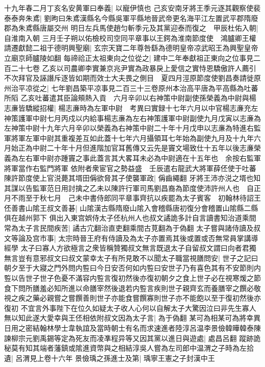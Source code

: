十九年春二月丁亥名安黄軍曰奉義|{
	以寵伊慎也}
己亥安南牙將王季元逐其觀察使裴泰泰奔朱鳶|{
	劉昫曰朱鳶漢縣名今縣吳軍平縣地晉武帝更名海平江左置武平郡隋廢郡為朱鳶縣唐屬交州}
明日左兵馬使趙匀斬季元及其黨迎泰而復之　甲辰杜佑入朝|{
	自淮南入朝}
三月壬子朔以佑檢校司空同平章事以王鍔為淮南節度使　鴻臚卿王權請遷獻懿二祖于德明興聖廟|{
	玄宗天寶二年尊咎繇為德明皇帝凉武昭王為興聖皇帝立廟京師臚陵如翻}
每禘祫正太祖東向之位從之|{
	建中二年奉獻祖正東向之位事見二百二十七卷}
乙亥以司農卿李實兼京兆尹實為政暴戾上愛信之實恃恩驕傲許人薦引不次拜官及誣譖斥逐皆如期而效士大夫畏之側目　夏四月涇原節度使劉昌奏請徙原州治平凉從之|{
	七年劉昌築平凉事見二百三十三卷原州本治高平唐為平高縣為吐蕃所䧟}
乙亥吐蕃遣其臣論頰熱入貢　六月辛卯以右神策中尉副使孫榮義為中尉與楊志亷皆驕縱招權|{
	楊志亷時為左軍中尉　考異曰實録十七年六月以中官楊志亷充左神策護軍中尉七月丙戍以内給事楊志亷為左右神策護軍中尉副使九月戊寅以志亷為左神策中尉十九年六月辛卯以榮義為右神策中尉二十年十月戊申以志亷為特進右監軍將軍左軍中尉其重複差互如此蓋十七年六月攝領耳七年始為副使九月及十九年六月始正為中尉二十年十月但進階加官耳舊傳又云先是竇文場致仕十五年以後志亷榮義為左右軍中尉亦踵竇之事此蓋言其大畧耳未必為中尉適在十五年也　余按右監軍將軍當作右監門將軍}
依附者衆宦官之勢益盛　壬辰遣右龍武大將軍薛伾使于吐蕃　陳許節度使上官涚薨其壻田偁欲脅其子使襲軍政|{
	偁齒繩翻}
牙將王沛亦涚之壻也知其謀以告監軍范日用討擒之乙未以陳許行軍司馬劉昌裔為節度使沛許州人也　自正月不雨至于秋七月　己未中書侍郎同平章事齊抗以疾罷為太子賓客　初翰林待詔王伾善書山隂王叔文善碁|{
	山隂漢古縣隋廢山隂入會稽縣唐初復分會稽置山隂縣二縣俱在越州郭下}
俱出入東宫娯侍太子伾杭州人也叔文譎詭多計自言讀書知治道乘間常為太子言民間疾苦|{
	譎古宂翻治直吏翻乘間古莧翻為于偽翻}
太子嘗與諸侍讀及叔文等論及宫市事|{
	太宗時晉王府有侍讀及為太子亦置焉其後或置或否無常員掌講導經學}
太子曰寡人方欲極言之衆皆稱贊獨叔文無言既退太子自留叔文謂曰向者君獨無言豈有意邪叔文曰叔文蒙幸太子有所見敢不以聞太子職當視膳問安|{
	世子之記曰朝夕至于大寢之門外問内䜿曰今日安否何如内䜿曰安世子乃有喜色其有不安節則内䜿以告世子世子色憂不滿容内䜿言復初然後亦復初朝夕之食上世子必在視寒煖之節食下問所膳羞必知所進以命膳宰然後退若内䜿言疾則世子親齊玄而養膳宰之饌必敬視之疾之藥必親嘗之嘗饌善則世子亦能食嘗饌寡則世子亦不能飽以至于復初然後亦復初}
不宜言外事陛下在位久如疑太子收人心何以自解太子大驚因泣曰非先生寡人無以知此遂大愛幸與王伾相依附叔文因為太子言|{
	為于偽翻}
某可為相某可為將幸異日用之密結翰林學士韋執誼及當時朝士有名而求速進者陸淳呂温李景儉韓曄韓泰陳諫柳宗元劉禹錫等定為死友而凌凖程异等又因其黨以進日與遊處|{
	處昌呂翻}
蹤跡詭秘莫有知其端者藩鎮或隂進資幣與之相結淳吳人嘗為左司郎中温渭之子時為左拾遺|{
	呂渭見上卷十六年}
景儉瑀之孫進士及第|{
	瑀寧王憲之子封漢中王}
